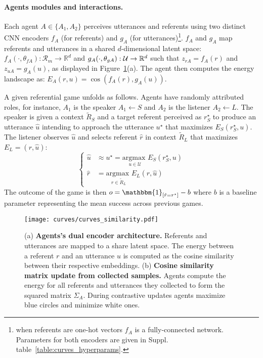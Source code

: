\paragraph{Agents modules and interactions. } Each agent $A\in\{A_1,A_2\}$ perceives utterances and referents using two distinct CNN encoders $f_A$ (for referents) and $g_A$ (for utterances)\footnote{when referents are one-hot vectors $f_A$ is a fully-connected network. Parameters for both encoders are given in Suppl. table~\ref{table:curves_hyperparams}.}. $f_A$ and $g_A$ map referents and utterances in a shared $d$-dimensional latent space: $f_A(\cdot,\theta_{fA}): \mathcal{R}_m \rightarrow \mathbb{R}^d$ and $g_A(\cdot,\theta_{gA}): \mathcal{U} \rightarrow  \mathbb{R}^d$ such that $z_{rA}=f_A(r)$ and $z_{uA}=g_A(u)$, as displayed in Figure~\ref{fig:curves_encoders}(a). The agent then computes the energy landscape as: $E_A(r,u) = \cos(f_A(r),g_A(u))$.

A given referential game unfolds as follows. Agents have randomly attributed roles, for instance, $A_1$ is the speaker $A_1\leftarrow S$ and $A_2$ is the listener $A_2 \leftarrow L$. The speaker is given a context $\tilde{R}_S$ and a target referent perceived as $r^\star_S$ to produce an utterance $\hat{u}$ intending to approach the utterance $u^\star$ that maximizes $E_S(r^\star_S,u)$. The listener observes $\hat{u}$ and selects referent $\hat{r}$ in context $\tilde{R}_L$ that maximizes $E_L=(r,\hat{u})$:
\begin{equation}
\left\{
\begin{split}
    \hat{u} &\approx u^\star= \underset{u \in \mathcal{U}}{\textrm{argmax }} E_S(r^\star_S,u) \\
    \hat{r} &= \underset{r \in \tilde{R}_L}{\textrm{argmax }} E_L(r,\hat{u}) \end{split}
\right.
\label{eq:ut_gen_ref_sel}
\end{equation}
The outcome of the game is then $o = \mathbbm{1}_{[\hat{r}=r^\star]} - b$ where $b$ is a baseline parameter representing the mean success across previous games. 


\begin{figure}[h!]
\centering 
\texttt{[image: curves/curves\_similarity.pdf]}
\caption{(a) \textbf{Agents's dual encoder architecture.} Referents and utterances are mapped to a share latent space. The energy between a referent $r$ and an utterance $u$ is computed as the cosine similarity between their respective embeddings. (b) \textbf{Cosine similarity matrix update from collected samples.} Agents compute the energy for all referents and utterances they collected to form the squared matrix $\Sigma_A$. During contrastive updates agents maximize blue circles and minimize white ones.}
\label{fig:curves_encoders}
\end{figure}

